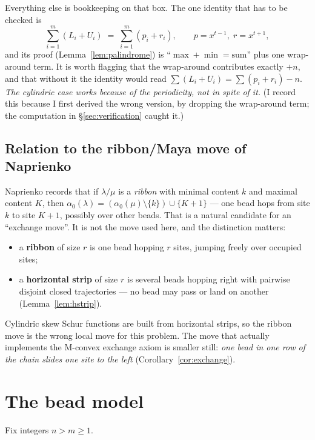 \documentclass[11pt]{article}
\theoremstyle{plain}
\theoremstyle{definition}
\begin{document}
Everything else is bookkeeping on that box. The one identity that has to be checked is
\[
  \sum_{i=1}^{m}(L_i+U_i)\;=\;\sum_{i=1}^{m}(p_i+r_i),
  \qquad p=x^{t-1},\; r=x^{t+1},
\]
and its proof (Lemma~\ref{lem:palindrome}) is ``$\max+\min=\text{sum}$'' plus one wrap-around
term. It is worth flagging that the wrap-around contributes exactly $+n$, and that without it
the identity would read $\sum(L_i+U_i)=\sum(p_i+r_i)-n$. \emph{The cylindric case works because
of the periodicity, not in spite of it.} (I record this because I first derived the wrong
version, by dropping the wrap-around term; the computation in \S\ref{sec:verification} caught
it.)

\subsection{Relation to the ribbon/Maya move of Naprienko}

Naprienko \cite[Lemma 4.4]{Nap} records that if $\lambda/\mu$ is a \emph{ribbon} with minimal
content $k$ and maximal content $K$, then $\alpha_0(\lambda)=(\alpha_0(\mu)\setminus\{k\})\cup
\{K+1\}$ --- one bead hops from site $k$ to site $K+1$, possibly over other beads. That is a
natural candidate for an ``exchange move''. It is not the move used here, and the distinction
matters:

\begin{itemize}
\item a \textbf{ribbon} of size $r$ is one bead hopping $r$ sites, jumping freely over
occupied sites;
\item a \textbf{horizontal strip} of size $r$ is several beads hopping right with pairwise
disjoint closed trajectories --- no bead may pass or land on another (Lemma~\ref{lem:hstrip}).
\end{itemize}

Cylindric skew Schur functions are built from horizontal strips, so the ribbon move is the
wrong local move for this problem. The move that actually implements the M-convex exchange
axiom is smaller still: \emph{one bead in one row of the chain slides one site to the left}
(Corollary~\ref{cor:exchange}).

\section{The bead model}\label{sec:beads}

Fix integers $n>m\ge 1$.
\end{document}
